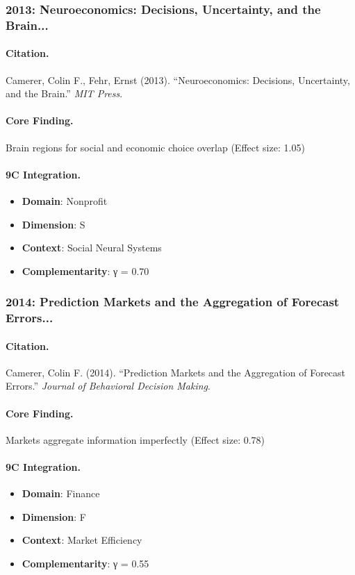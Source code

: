 \subsubsection{2013: Neuroeconomics: Decisions, Uncertainty, and the Brain...}

\paragraph{Citation.}
Camerer, Colin F., Fehr, Ernst (2013). ``Neuroeconomics: Decisions, Uncertainty, and the Brain.''
\textit{MIT Press}.

\paragraph{Core Finding.}
Brain regions for social and economic choice overlap (Effect size: 1.05)

\paragraph{9C Integration.}
\begin{itemize}[nosep]
  \item \textbf{Domain}: Nonprofit
  \item \textbf{Dimension}: S
  \item \textbf{Context}: Social Neural Systems
  \item \textbf{Complementarity}: γ = 0.70
\end{itemize}

\subsubsection{2014: Prediction Markets and the Aggregation of Forecast Errors...}

\paragraph{Citation.}
Camerer, Colin F. (2014). ``Prediction Markets and the Aggregation of Forecast Errors.''
\textit{Journal of Behavioral Decision Making}.

\paragraph{Core Finding.}
Markets aggregate information imperfectly (Effect size: 0.78)

\paragraph{9C Integration.}
\begin{itemize}[nosep]
  \item \textbf{Domain}: Finance
  \item \textbf{Dimension}: F
  \item \textbf{Context}: Market Efficiency
  \item \textbf{Complementarity}: γ = 0.55
\end{itemize}

